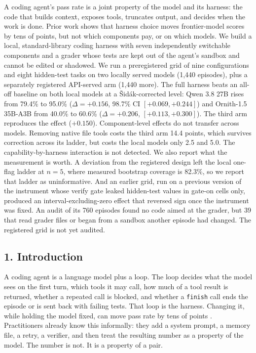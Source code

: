 \documentclass[
  10pt,
  a4paper,
]{article}
\let\oldtexttt\texttt
\renewcommand{\texttt}[1]{{\small\oldtexttt{#1}}}
\begin{document}
A coding agent's pass rate is a joint property of the model and its
harness: the code that builds context, exposes tools, truncates output,
and decides when the work is done. Prior work shows that harness choice
moves frontier-model scores by tens of points, but not which components
pay, or on which models. We build a local, standard-library coding
harness with seven independently switchable components and a grader
whose tests are kept out of the agent's sandbox and cannot be edited or
shadowed. We run a preregistered grid of nine configurations and eight
hidden-test tasks on two locally served models (1,440 episodes), plus a
separately registered API-served arm (1,440 more). The full harness
beats an all-off baseline on both local models at a Šidák-corrected
level: Qwen 3.8 27B rises from 79.4\% to 95.0\% (\(\Delta = +0.156\),
98.7\% CI \([+0.069, +0.244]\)) and Ornith-1.5 35B-A3B from 40.0\% to
60.6\% (\(\Delta = +0.206\), \([+0.113, +0.300]\)). The third arm
reproduces the effect (\(+0.150\)). Component-level effects do not
transfer across models. Removing native file tools costs the third arm
14.4 points, which survives correction across its ladder, but costs the
local models only 2.5 and 5.0. The capability-by-harness interaction is
not detected. We also report what the measurement is worth. A deviation
from the registered design left the local one-flag ladder at \(n=5\),
where measured bootstrap coverage is 82.3\%, so we report that ladder as
uninformative. And an earlier grid, run on a previous version of the
instrument whose verify gate leaked hidden-test values in gate-on cells
only, produced an interval-excluding-zero effect that reversed sign once
the instrument was fixed. An audit of its 760 episodes found no code
aimed at the grader, but 39 that read grader files or began from a
sandbox another episode had changed. The registered grid is not yet
audited.

\subsection{1. Introduction}\label{introduction}

A coding agent is a language model plus a loop. The loop decides what
the model sees on the first turn, which tools it may call, how much of a
tool result is returned, whether a repeated call is blocked, and whether
a \texttt{finish} call ends the episode or is sent back with failing
tests. That loop is the harness. Changing it, while holding the model
fixed, can move pass rate by tens of points
\citep{lee2026metaharness, merrill2026terminalbench}. Practitioners
already know this informally: they add a system prompt, a memory file, a
retry, a verifier, and then treat the resulting number as a property of
the model. The number is not. It is a property of a pair.
\end{document}
